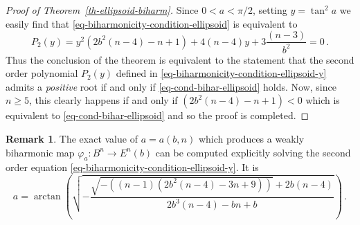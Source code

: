 \documentclass[11pt]{amsart}
\theoremstyle{plain}
\theoremstyle{definition}
\newtheorem{remark}       [theorem]  {Remark}
\numberwithin{equation}{section}
\numberwithin{equation}{section}
\begin{document}
\begin{proof}[Proof of Theorem~\ref{th-ellipsoid-biharm}]
Since $0 < a < \pi/2$, setting $y=\tan ^2 a$ we easily find that \eqref{eq-biharmonicity-condition-ellipsoid} is equivalent to
\begin{equation}\label{eq-biharmonicity-condition-ellipsoid-y}
P_2(y)= y^2 \left(2 b^2 (n-4)-n+1\right)+4 (n-4) y+3 \frac{(n-3)}{b^2}=0 \,.
\end{equation}
Thus the conclusion of the theorem is equivalent to the statement that the second order polynomial $P_2(y)$ defined in \eqref{eq-biharmonicity-condition-ellipsoid-y} admits a \textit{positive} root if and only if \eqref{eq-cond-bihar-ellipsoid} holds. Now, since $n \geq 5$, this clearly happens if and only if $\left(2 b^2 (n-4)-n+1\right)<0$ which is equivalent to \eqref{eq-cond-bihar-ellipsoid} and so the proof is completed.
\end{proof} 
\begin{remark} The exact value of $a=a(b,n)$ which produces a weakly biharmonic map $\varphi_a:B^n \to E^n(b)$ can be computed explicitly solving the second order equation \eqref{eq-biharmonicity-condition-ellipsoid-y}. It is
\[
a=\arctan \left ( \sqrt{-\frac{\sqrt{-\left((n-1) \left(2 b^2 (n-4)-3 n+9\right)\right)}+2 b (n-4)}{2 b^3 (n-4)-b n+b}} \right ) \,.
\]
\end{remark}
\vspace{2mm}
\end{document}
